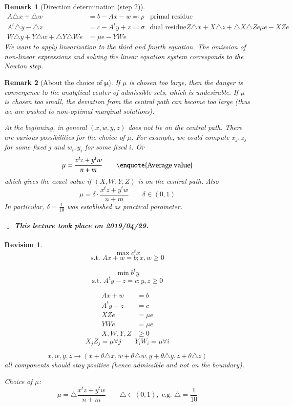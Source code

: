 \documentclass[a4paper]{article}
\numberwithin{lecref}{subsection}
\newtheorem*{Remark}{Remark}
\newtheorem*{Revision}{Revision}
\newcommand{\dateref}[1]{%
  \begin{mdframed}[backgroundcolor=gray!10,innerbottommargin=0pt,innertopmargin=0pt]
    \paragraph{\textit{$\downarrow$ This lecture took place on #1.}}%
  \end{mdframed}%
}
\begin{document}
\begin{Remark}[Direction determination (step 2)]
	\begin{align*}
		A \triangle x + \triangle w &= b - Ax - w \eqqcolon \rho & \text{primal residue} \\
		A^t \triangle y - \triangle z &= c - A^t y + z \eqqcolon \sigma & \text{dual residue}
		Z \triangle x + X \triangle z + \triangle X \triangle Z e &= \mu e - XZe \\
		W \triangle y + Y \triangle w + \triangle Y \triangle W e &= \mu e - YWe
	\end{align*}
	We want to apply linearization to the third and fourth equation.
	The omission of non-linear expressions and solving the linear equation system corresponds to the Newton step.
\end{Remark}

\begin{Remark}[About the choice of $\mathbf \mu$]
	If $\mu$ is chosen too large, then the danger is convergence to the analytical center of admissible sets, which is undesirable.
	If $\mu$ is chosen too small, the deviation from the central path can become too large (thus we are pushed to non-optimal marginal solutions).

	At the beginning, in general $(x, w, y, z)$ does not lie on the central path.
	There are various possibilities for the choice of $\mu$.
	For example, we could compute $x_j, z_j$ for some fixed $j$ and $w_i, y_i$ for some fixed $i$. Or
	\[ \mu = \frac{x^t z + y^t w}{n + m} \qquad \text{\enquote{Average value}} \]
	which gives the exact value if $(X, W, Y, Z)$ is on the central path. Also
	\[ \mu = \delta \cdot \frac{x^t z+ y^t w}{n + m} \qquad \delta \in (0, 1) \]
	In particular, $\delta = \frac1{10}$ was established as practical parameter.
\end{Remark}

\dateref{2019/04/29}

\begin{Revision}
	\[ \max c^t x \]
	\[ \text{s.t. } Ax + w = b; x, w \geq 0 \]

	\[ \min b^t y \]
	\[ \text{s.t. } A^t y - z = c; y, z \geq 0 \]

	\begin{align*}
		Ax + w &= b \\
		A^t y - z &= c \\
		XZe &= \mu e \\
		YWe &= \mu e \\
		X, W, Y, Z &\geq 0
	\end{align*}
	\[ X_j Z_j = \mu \forall j \qquad Y_i W_i = \mu \forall i \]

	\[ x, w, y, z \to (x + \theta \triangle x, w + \theta \triangle w, y + \theta \triangle y, z + \theta \triangle z) \]
	all components should stay positive (hence admissible and not on the boundary).

	Choice of $\mu$:
	\[ \mu = \triangle \frac{x^tz + y^tw}{n + m} \qquad \triangle \in (0, 1), \text{ e.g. } \triangle = \frac{1}{10} \]
\end{Revision}
\end{document}
